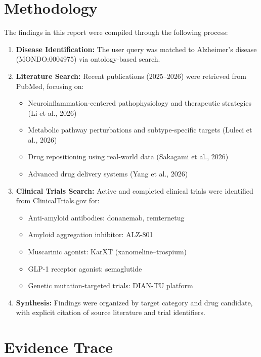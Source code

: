\documentclass[11pt, a4paper]{article}
\begin{document}
\section{Methodology}
\label{sec:methods}

The findings in this report were compiled through the following process:

\begin{enumerate}
    \item \textbf{Disease Identification:} The user query was matched to Alzheimer's disease (MONDO:0004975) via ontology-based search.
    \item \textbf{Literature Search:} Recent publications (2025--2026) were retrieved from PubMed, focusing on:
    \begin{itemize}
        \item Neuroinflammation-centered pathophysiology and therapeutic strategies (Li et al., 2026)
        \item Metabolic pathway perturbations and subtype-specific targets (Luleci et al., 2026)
        \item Drug repositioning using real-world data (Sakagami et al., 2026)
        \item Advanced drug delivery systems (Yang et al., 2026)
    \end{itemize}
    \item \textbf{Clinical Trials Search:} Active and completed clinical trials were identified from ClinicalTrials.gov for:
    \begin{itemize}
        \item Anti-amyloid antibodies: donanemab, remternetug
        \item Amyloid aggregation inhibitor: ALZ-801
        \item Muscarinic agonist: KarXT (xanomeline--trospium)
        \item GLP-1 receptor agonist: semaglutide
        \item Genetic mutation-targeted trials: DIAN-TU platform
    \end{itemize}
    \item \textbf{Synthesis:} Findings were organized by target category and drug candidate, with explicit citation of source literature and trial identifiers.
\end{enumerate}

\section{Evidence Trace}
\label{sec:trace}
\end{document}
